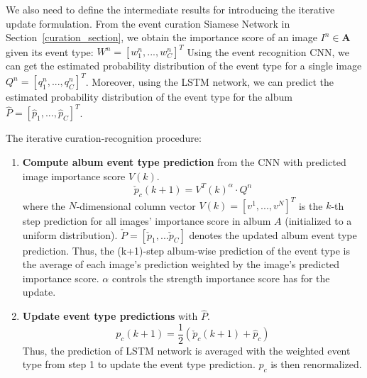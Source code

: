 \documentclass[runningheads]{llncs}
\begin{document}
We also need to define the intermediate results for introducing the iterative update formulation. From the event curation Siamese Network in Section~\ref{curation_section}, we obtain the importance score of an image $I^{n} \in \mathbf{A} $ given its event type: $W^{n}= \left [w_{1}^{n} , ..., w_{C}^{n}  \right ]^{T}$
Using the event recognition CNN, we can get the estimated probability distribution of the event type for a single image
$Q^{n}= \left [ q_{1}^{n} , ..., q_{C}^{n}  \right ]^{T}$. Moreover, using the LSTM network, we can predict the estimated probability distribution of the event type for the album $\hat{P} = [\hat{p}_{1}, ..., \hat{p}_{C}]^{T}$. 


The iterative curation-recognition procedure:
\begin{enumerate}
  \item \textbf{Compute album event type prediction} from the CNN with predicted image importance score $V(k)$.
  \begin{equation}
  \check{p}_{c}(k+1) = V^{T}(k)^{\alpha }\cdot  Q^{n}
  \label{eq1}
  \end{equation}
  where the $N$-dimensional column vector $V(k) = [v^{1}, ..., v^{N}]^{T}$ is the $k$-th step prediction for all images' importance score in album $A$ (initialized to a uniform distribution). $\check{P} = [\check{p}_{1}, ... \check{p}_{C}]$ denotes the updated  album event type prediction. Thus, the (k+1)-step album-wise prediction of the event type is the average of each image's prediction weighted by the image's predicted importance score. $\alpha$ controls the strength importance score has for the update.
%
%
%
%
%
%
\vspace{0.05in}
    \item \textbf{Update event type predictions} with $\hat{P}$.
  \begin{equation}
  p_{c}(k+1) = \frac{1}{2}(\check{p}_{c}(k+1) + \hat{p}_{c})
  \label{eq2}
  \end{equation}
Thus, the prediction of LSTM network is averaged with the weighted event type from step 1 to update the event type prediction. $p_{c}$ is then renormalized. 

\end{enumerate}
\end{document}

